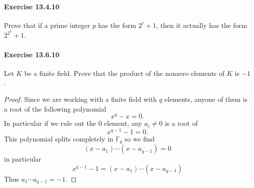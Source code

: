 \documentclass{article}
\begin{document}
\paragraph{Exercise 13.4.10} Prove that if a prime integer $p$ has the form $2^r+1$, then it actually has the form $2^{2^k}+1$.


\paragraph{Exercise 13.6.10} Let $K$ be a finite field. Prove that the product of the nonzero elements of $K$ is $-1$.
\begin{proof}
    Since we are working with a finite field with $q$ elements, anyone of them is a root of the following polynomial
$$
x^q-x=0 .
$$
In particular if we rule out the 0 element, any $a_i \neq 0$ is a root of
$$
x^{q-1}-1=0 .
$$
This polynomial splits completely in $\mathbb{F}_q$ so we find
$$
\left(x-a_1\right) \cdots\left(x-a_{q-1}\right)=0
$$
in particular
$$
x^{q-1}-1=\left(x-a_1\right) \cdots\left(x-a_{q-1}\right)
$$
Thus $a_1 \cdots a_{q-1}=-1$.
\end{proof}
\end{document}
